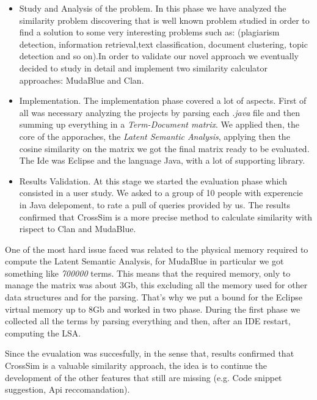 \begin{itemize}
	\item Study and Analysis of the problem. In this phase we have analyzed the similarity problem discovering that is well known problem studied in order to find a solution to some very interesting problems such as: (plagiarism detection, information retrieval,text classification, document clustering, topic detection and so on).In order to validate our novel approach we eventually decided to study in detail and implement two similarity calculator approaches: MudaBlue and Clan.
	\item Implementation. The implementation phase covered a lot of aspects. First of all was necessary analyzing the projects by parsing each \emph{.java} file and then summing up everything in a \emph{Term-Document matrix}. We applied then, the core of the apporaches, the \emph{Latent Semantic Analysis}, applying then the cosine similarity on the matrix we got the final matrix ready to be evaluated. The Ide was Eclipse and the language Java, with a lot of supporting library.
	\item Results Validation. At this stage we started the evaluation phase which consisted in a user study. We asked to a group of 10 people with experencie in Java delepoment, to rate a pull of queries provided by us. The results confirmed that CrossSim is a more precise method to calculate similarity with rispect to Clan and MudaBlue.
\end{itemize}

One of the most hard issue faced was related to the physical memory required to compute the Latent Semantic Analysis, for MudaBlue in particular we got something like \emph{700000} terms. This means that the required memory, only to manage the matrix was about 3Gb, this excluding all the memory used for other data structures and for the parsing. That's why we put a bound for the Eclipse virtual memory up to 8Gb and worked in two phase. During the first phase we collected all the terms by parsing everything and then, after an IDE restart, computing the LSA.

Since the evualation was succesfully, in the sense that, results confirmed that CrossSim is a valuable similarity approach, the idea is to continue the development of the other features that still are missing (e.g. Code snippet suggestion, Api reccomandation).
